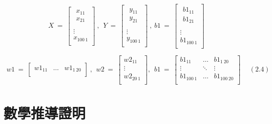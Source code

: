 \documentclass[11pt,UTF8]{ctexart}
\begin{document}
$$X\ =\ \left[\begin{matrix}\begin{matrix}x_{11}\\x_{21}\\\end{matrix}\\\vdots\\x_{100\ 1}\\\end{matrix}\right]\ ,\ \ Y\ =\ \left[\begin{matrix}\begin{matrix}y_{11}\\y_{21}\\\end{matrix}\\\vdots\\y_{100\ 1}\\\end{matrix}\right]\ ,\ b1\ =\ \left[\begin{matrix}\begin{matrix}{b1}_{11}\\{b1}_{21}\\\end{matrix}\\\vdots\\{b1}_{100\ 1}\\\end{matrix}\right]$$

$$\ \ w1\ =\ \left[\begin{matrix}{w1}_{11}&\ldots&{w1}_{1\ 20}\\\end{matrix}\right]\ ,\ \ w2\ =\ \left[\begin{matrix}{w2}_{11}\\\vdots\\{w2}_{20\ 1}\\\end{matrix}\right],\ \ b1\ =\ \left[\begin{matrix}{b1}_{11}&\ldots&{b1}_{1\ 20}\\\vdots&\ddots&\vdots\\{b1}_{100\ 1}&\ldots&{b1}_{100\ 20}\\\end{matrix}\right]   \quad \ (2.4) $$


\section{數學推導證明}
\end{document}
